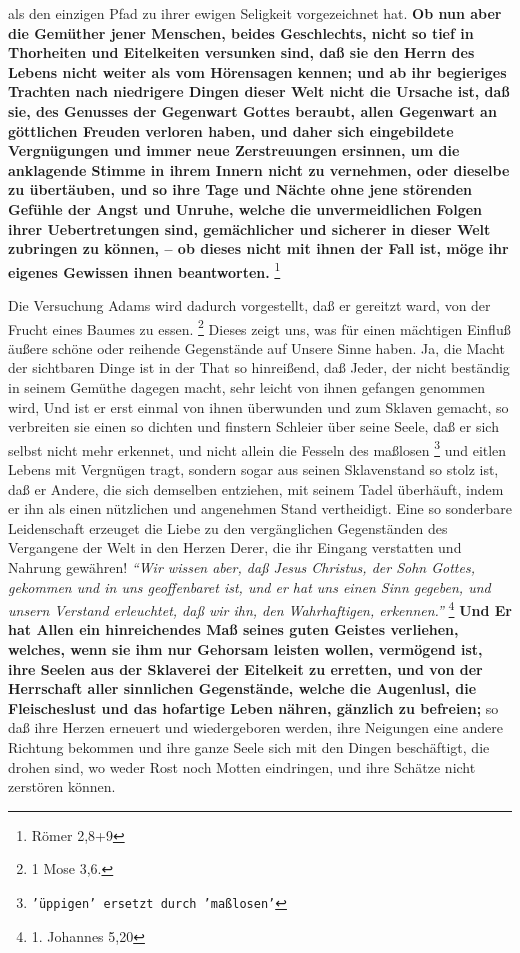 {als den einzigen Pfad zu ihrer ewigen Seligkeit vorgezeichnet hat. \textbf{Ob
nun aber
die Gemüther jener Menschen, beides Geschlechts, nicht so tief in Thorheiten und
Eitelkeiten versunken sind, daß sie den Herrn des Lebens nicht weiter als vom
Hörensagen kennen; und ab ihr begieriges Trachten nach niedrigere Dingen dieser
Welt nicht die Ursache ist, daß sie, des Genusses der Gegenwart Gottes beraubt,
allen Gegenwart an göttlichen Freuden verloren haben, und daher sich
eingebildete Vergnügungen und immer neue Zerstreuungen ersinnen, um die
anklagende Stimme in ihrem Innern nicht zu vernehmen, oder dieselbe zu
übertäuben, und so ihre Tage und Nächte ohne jene störenden Gefühle der Angst
und Unruhe, welche die unvermeidlichen Folgen ihrer Uebertretungen sind,
gemächlicher und sicherer in dieser Welt zubringen zu können, -- ob dieses nicht
mit ihnen der Fall ist, möge ihr eigenes Gewissen ihnen
beantworten.}
\footnote{Römer 2,8+9}

\medskip

Die Versuchung Adams wird dadurch vorgestellt, daß er gereitzt ward, von der
Frucht eines Baumes zu essen.
\footnote{1 Mose 3,6.}
Dieses zeigt uns, was für
einen mächtigen Einfluß äußere schöne oder reihende Gegenstände auf Unsere Sinne
haben. Ja, die Macht der sichtbaren Dinge ist in der That so hinreißend, daß
Jeder, der nicht beständig in seinem Gemüthe dagegen macht, sehr leicht von
ihnen gefangen genommen wird, Und ist er erst einmal von ihnen überwunden und
zum Sklaven gemacht, so verbreiten sie einen so dichten
und finstern Schleier
über seine Seele, daß er sich selbst nicht mehr erkennet, und nicht allein die
Fesseln des maßlosen
\footnote{\texttt{'üppigen' ersetzt durch 'maßlosen'}} und eitlen Lebens mit
Vergnügen tragt, sondern sogar aus
seinen Sklavenstand so stolz ist, daß er Andere, die sich
demselben entziehen,
mit seinem Tadel überhäuft, indem er ihn als einen nützlichen und angenehmen
Stand vertheidigt. Eine so sonderbare Leidenschaft erzeuget die Liebe zu den
vergänglichen Gegenständen des Vergangene der Welt in den Herzen Derer, die ihr
Eingang verstatten und Nahrung gewähren!
\textit{"`Wir wissen aber, daß Jesus Christus,
der Sohn Gottes, gekommen und in uns geoffenbaret ist, und er hat uns einen Sinn
gegeben, und unsern Verstand erleuchtet, daß wir ihn, den Wahrhaftigen,
erkennen."'}
\footnote{1. Johannes 5,20}
\textbf{Und Er hat Allen ein hinreichendes Maß seines
guten Geistes verliehen, welches, wenn sie ihm nur Gehorsam leisten wollen,
vermögend ist, ihre Seelen aus der Sklaverei der Eitelkeit zu erretten, und von
der Herrschaft aller sinnlichen Gegenstände, welche die Augenlusl, die
Fleischeslust und das hofartige Leben nähren, gänzlich zu befreien;} so daß ihre
Herzen erneuert und wiedergeboren werden, ihre Neigungen
eine andere Richtung
bekommen und ihre ganze Seele sich mit den Dingen beschäftigt, die drohen sind,
wo weder Rost noch Motten eindringen, und ihre Schätze nicht zerstören können.

}
